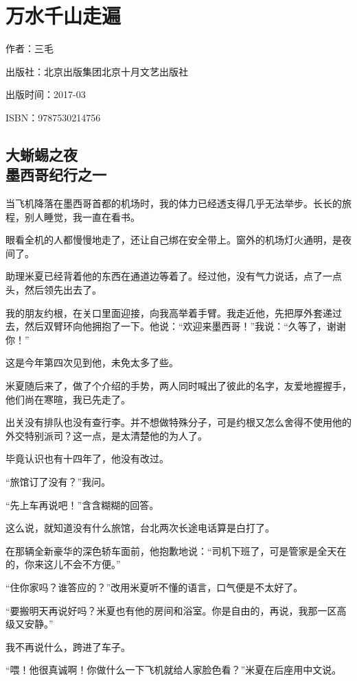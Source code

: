 
\section{万水千山走遍}

\par 作者：三毛
\par 出版社：北京出版集团北京十月文艺出版社
\par 出版时间：2017-03
\par ISBN：9787530214756

\subsection{大蜥蜴之夜\\\small{墨西哥纪行之一}}

\par 当飞机降落在墨西哥首都的机场时，我的体力已经透支得几乎无法举步。长长的旅程，别人睡觉，我一直在看书。
\par 眼看全机的人都慢慢地走了，还让自己绑在安全带上。窗外的机场灯火通明，是夜间了。
\par 助理米夏已经背着他的东西在通道边等着了。经过他，没有气力说话，点了一点头，然后领先出去了。
\par 我的朋友约根，在关口里面迎接，向我高举着手臂。我走近他，先把厚外套递过去，然后双臂环向他拥抱了一下。他说：“欢迎来墨西哥！”我说：“久等了，谢谢你！”
\par 这是今年第四次见到他，未免太多了些。
\par 米夏随后来了，做了个介绍的手势，两人同时喊出了彼此的名字，友爱地握握手，他们尚在寒暄，我已先走了。
\par 出关没有排队也没有查行李。并不想做特殊分子，可是约根又怎么舍得不使用他的外交特别派司？这一点，是太清楚他的为人了。
\par 毕竟认识也有十四年了，他没有改过。
\par “旅馆订了没有？”我问。
\par “先上车再说吧！”含含糊糊的回答。
\par 这么说，就知道没有什么旅馆，台北两次长途电话算是白打了。
\par 在那辆全新豪华的深色轿车面前，他抱歉地说：“司机下班了，可是管家是全天在的，你来这儿不会不方便。”
\par “住你家吗？谁答应的？”改用米夏听不懂的语言，口气便是不太好了。
\par “要搬明天再说好吗？米夏也有他的房间和浴室。你是自由的，再说，我那一区高级又安静。”
\par 我不再说什么，跨进了车子。
\par “喂！他很真诚啊！你做什么一下飞机就给人家脸色看？”米夏在后座用中文说。
